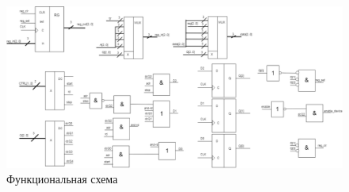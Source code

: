 \begin{figure}
  \includegraphics[scale=0.35]{./FCA.png}
  \caption{Функциональная схема }
  \label{fig:fca}
\end{figure}